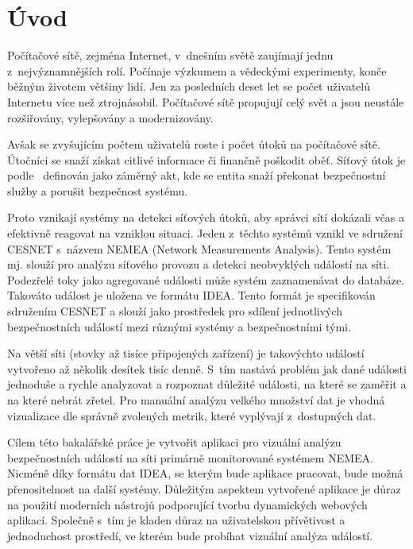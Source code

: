 
\newcommand\note[1]{{\Large \textcolor{red}{#1}}}

\chapter{Úvod}
Počítačové sítě, zejména Internet, v~dnešním světě zaujímají jednu z~nejvýznamnějších rolí. Počínaje výzkumem a vědeckými experimenty, konče běžným životem většiny lidí. Jen za posledních deset let se počet uživatelů Internetu více než ztrojnásobil. Počítačové sítě propujují celý svět a jsou neustále rozšiřovány, vylepšovány a modernizovány.

Avšak se zvyšujícím počtem uživatelů roste i počet útoků na počítačové sítě. Útočníci se snaží získat citlivé informace či finančně poškodit oběť. Síťový útok je podle~\cite{rfc:attack} definován jako záměrný akt, kde se entita snaží překonat bezpečnostní služby a porušit bezpečnost systému. 

Proto vznikají systémy na detekci síťových útoků, aby správci sítí dokázali včas a efektivně reagovat na vzniklou situaci. Jeden z~těchto systémů vznikl ve sdružení CESNET s~názvem NEMEA (Network Measurements Analysis). Tento systém mj. slouží pro analýzu síťového provozu a detekci neobvyklých událostí na síti. Podezřelé toky jako agregované události může systém zaznamenávat do databáze. Takováto událost je uložena ve formátu IDEA. Tento formát je specifikován sdružením CESNET a slouží jako prostředek pro sdílení jednotlivých bezpečnostních událostí mezi různými systémy a bezpečnostními tými.

Na větší síti (stovky až tisíce připojených zařízení) je takovýchto událostí vytvořeno až několik desítek tisíc denně. S~tím nastává problém jak dané události jednoduše a rychle analyzovat a rozpoznat důležité události, na které se zaměřit a na které nebrát zřetel. Pro manuální analýzu velkého množství dat je vhodná vizualizace dle správně zvolených metrik, které vyplývají z~dostupných dat.

Cílem této bakalářské práce je vytvořit aplikaci pro vizuální analýzu bezpečnostních událostí na síti primárně monitorované systémem NEMEA. Nicméně díky formátu dat IDEA, se kterým bude aplikace pracovat, bude možná přenositelnost na další systémy. Důležitým aspektem vytvořené aplikace je důraz na použití moderních nástrojů podporující tvorbu dynamických webových aplikací. Společně s~tím je kladen důraz na uživatelskou přívětivost a jednoduchost prostředí, ve kterém bude probíhat vizuální analýza událostí.

